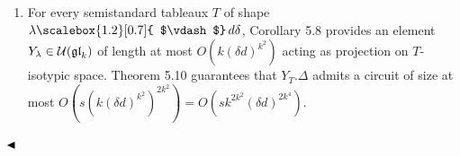 \begin{enumerate}
\item 
 


For every semistandard tableaux $T$ of shape $\lambda\mathchoice{\scalebox{1.2}[0.7]{ $\vdash$}\,}{\scalebox{1.2}[0.7]{ $\vdash$}\,}{\scalebox{0.7}{\scalebox{1.2}[0.7]{$\vdash$}}\,}{\scalebox{0.5}{\scalebox{1.2}[0.7]{$\vdash$}}\,}d\delta$, Corollary 5.8 provides an element $Y_{\lambda}\nobreak\in\nobreak\mathcal{U}(\mathfrak{gl}_{k})$ of length at most $O(k(\delta d)^{k^{2}})$ acting as projection on $T$-isotypic space. Theorem 5.10 guarantees that $Y_{T}.\Delta$ admits a circuit of size at most $O(s(k(\delta d)^{k^{2}})^{2k^{2}})=O(sk^{2k^{2}}(\delta d)^{2k^{4}})$.





\end{enumerate}


$\hfill\blacktriangleleft$





